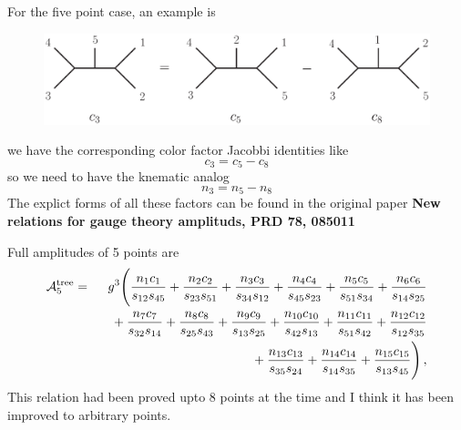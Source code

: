 \documentclass{beamer}
\begin{document}
\begin{frame}
    For the five point case, an example is 
    \begin{figure}[htb]
        \centering
        \includegraphics[width=1\linewidth]{FivePtTwist2.eps}
    \end{figure}
    we have the corresponding color factor Jacobbi identities like
    \begin{equation*}
        c_3=c_5-c_8
    \end{equation*}
    so we need to have the knematic analog
    \begin{equation*}
        n_3=n_5-n_8
    \end{equation*}
    The explict forms of all these factors can be found in the original paper \textbf{New relations for gauge theory amplituds, PRD 78, 085011}
\end{frame}
\begin{frame}
    Full amplitudes of 5 points are
    \begin{eqnarray*}
        \mathcal {A}^\mathrm{tree}_5& = & 
        g^3\Biggl( {n_1 c_1\over s_{12}s_{45}}+{n_2 c_2\over s_{23}s_{51}}
        +{n_3 c_3 \over s_{34}s_{12}}+{n_4 c_4\over s_{45}s_{23}}
        +{n_5 c_5\over s_{51}s_{34}} +{n_{6} c_6\over s_{14}s_{25}}  \\
        &&\null \hskip .3 cm 
        + {n_7 c_7\over s_{32}s_{14}}+{n_{8} c_8\over s_{25}s_{43}}
        +{n_{9} c_9\over s_{13}s_{25}}+{n_{10} c_{10}\over s_{42}s_{13}}
        +{n_{11} c_{11}\over s_{51}s_{42}}+ {n_{12} c_{12}\over s_{12}s_{35}}  \\
        &&\null \hskip .3 cm 
        +{n_{13} c_{13}\over s_{35}s_{24}} 
        +{n_{14} c_{14}\over s_{14}s_{35}}
        +{n_{15} c_{15}\over s_{13}s_{45}}\Biggr)\,,
        \end{eqnarray*}
    This relation had been proved upto 8 points at the time and I think it has been improved to arbitrary points.  
\end{frame}
\end{document}
